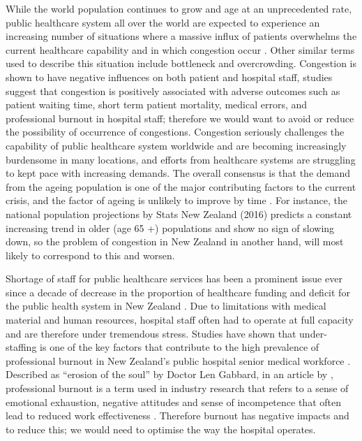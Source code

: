 While the world population continues to grow and age at an unprecedented rate, public healthcare system all over the world are expected to experience an increasing number of situations where a massive influx of patients overwhelms the current healthcare capability and in which congestion occur \citep{ morley2018emergency, wong2010understanding}. Other similar terms used to describe this situation include bottleneck and overcrowding. Congestion is shown to have negative influences on both patient and hospital staff, studies \citep{chambers2016burnout, khare2009adding, salway2017emergency} suggest that congestion is positively associated with adverse outcomes such as patient waiting time, short term patient mortality, medical errors, and professional burnout in hospital staff; therefore we would want to avoid or reduce the possibility of occurrence of congestions. Congestion seriously challenges the capability of public healthcare system worldwide and are becoming increasingly burdensome in many locations, and efforts from healthcare systems are struggling to kept pace with increasing demands. The overall consensus is that the demand from the ageing population is one of the major contributing factors to the current crisis, and the factor of ageing is unlikely to improve by time \citep{bayley2005financial, cornwall2004impact, wong2010understanding}. For instance, the national population projections by Stats New Zealand (2016) predicts a constant increasing trend in older (age 65 +) populations and show no sign of slowing down, so the problem of congestion in New Zealand in another hand, will most likely to correspond to this and worsen. 

\newpara

Shortage of staff for public healthcare services has been a prominent issue ever since a decade of decrease in the proportion of healthcare funding and deficit for the public health system in New Zealand \citep{akoorie2018, WB2019}. Due to limitations with medical material and human resources, hospital staff often had to operate at full capacity and are therefore under tremendous stress. Studies have shown that under-staffing is one of the key factors that contribute to the high prevalence of professional burnout in New Zealand’s public hospital senior medical workforce \citep{chambers2016burnout}. Described as “erosion of the soul” by Doctor Len Gabbard, in an article by \cite{HemOnc2008}, professional burnout is a term used in industry research that refers to a sense of emotional exhaustion, negative attitudes and sense of incompetence that often lead to reduced work effectiveness \citep{paterson2011professional}. Therefore burnout has negative impacts and to reduce this; we would need to optimise the way the hospital operates.  

